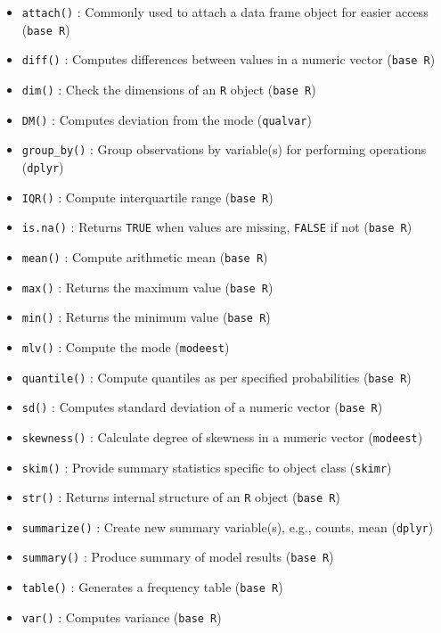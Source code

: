 \documentclass[
]{book}
\providecommand{\tightlist}{%
  \setlength{\itemsep}{0pt}\setlength{\parskip}{0pt}}
\begin{document}
\begin{itemize}
\tightlist
\item
  \texttt{attach()} : Commonly used to attach a data frame object for easier access (\texttt{base\ R})
\item
  \texttt{diff()} : Computes differences between values in a numeric vector (\texttt{base\ R})
\item
  \texttt{dim()} : Check the dimensions of an \texttt{R} object (\texttt{base\ R})
\item
  \texttt{DM()} : Computes deviation from the mode (\texttt{qualvar})
\item
  \texttt{group\_by()} : Group observations by variable(s) for performing operations (\texttt{dplyr})
\item
  \texttt{IQR()} : Compute interquartile range (\texttt{base\ R})
\item
  \texttt{is.na()} : Returns \texttt{TRUE} when values are missing, \texttt{FALSE} if not (\texttt{base\ R})
\item
  \texttt{mean()} : Compute arithmetic mean (\texttt{base\ R})
\item
  \texttt{max()} : Returns the maximum value (\texttt{base\ R})
\item
  \texttt{min()} : Returns the minimum value (\texttt{base\ R})
\item
  \texttt{mlv()} : Compute the mode (\texttt{modeest})
\item
  \texttt{quantile()} : Compute quantiles as per specified probabilities (\texttt{base\ R})
\item
  \texttt{sd()} : Computes standard deviation of a numeric vector (\texttt{base\ R})
\item
  \texttt{skewness()} : Calculate degree of skewness in a numeric vector (\texttt{modeest})
\item
  \texttt{skim()} : Provide summary statistics specific to object class (\texttt{skimr})
\item
  \texttt{str()} : Returns internal structure of an \texttt{R} object (\texttt{base\ R})
\item
  \texttt{summarize()} : Create new summary variable(s), e.g., counts, mean (\texttt{dplyr})
\item
  \texttt{summary()} : Produce summary of model results (\texttt{base\ R})
\item
  \texttt{table()} : Generates a frequency table (\texttt{base\ R})
\item
  \texttt{var()} : Computes variance (\texttt{base\ R})
\end{itemize}
\end{document}
